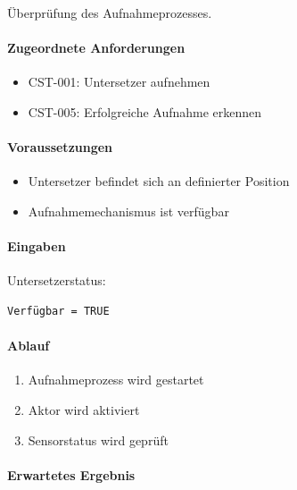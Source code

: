 Überprüfung des Aufnahmeprozesses.

\paragraph{Zugeordnete Anforderungen}\label{zugeordnete-anforderungen-5}

\begin{itemize}
\tightlist
\item
  CST-001: Untersetzer aufnehmen
\item
  CST-005: Erfolgreiche Aufnahme erkennen
\end{itemize}

\paragraph{Voraussetzungen}\label{voraussetzungen-5}

\begin{itemize}
\tightlist
\item
  Untersetzer befindet sich an definierter Position
\item
  Aufnahmemechanismus ist verfügbar
\end{itemize}

\paragraph{Eingaben}\label{eingaben-5}

Untersetzerstatus:

\begin{verbatim}
Verfügbar = TRUE
\end{verbatim}

\paragraph{Ablauf}\label{ablauf-5}

\begin{enumerate}
\def\labelenumi{\arabic{enumi}.}
\tightlist
\item
  Aufnahmeprozess wird gestartet
\item
  Aktor wird aktiviert
\item
  Sensorstatus wird geprüft
\end{enumerate}

\paragraph{Erwartetes Ergebnis}\label{erwartetes-ergebnis-5}

